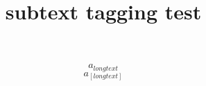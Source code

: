 \documentclass{article}
\title{subtext tagging test}
\begin{document}
\begin{equation}
a_{long text}
\end{equation}
\begin{equation}
a_[long text]
\end{equation}
\end{document}
